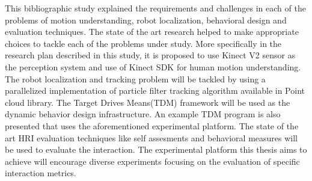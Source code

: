 	This bibliographic study explained the requirements and challenges in each of the problems of motion understanding, robot localization, behavioral design and evaluation techniques. The state of the art research helped to make appropriate choices to tackle each of the problems under study. More specifically in the research plan described in this study, it is proposed to use Kinect V2 sensor as the perception system and use of Kinect SDK for human motion understanding. The robot localization and tracking problem will be tackled by using a parallelized implementation of particle filter tracking algorithm available in Point cloud library. The Target Drives Means(TDM) framework will be used as the dynamic behavior design infrastructure. An example TDM program is also presented that uses the aforementioned experimental platform. The state of the art HRI evaluation techniques like self assesments and behavioral measures will be used to evaluate the interaction. The experimental platform this thesis aims to achieve will encourage diverse experiments focusing on the evaluation of specific interaction metrics.